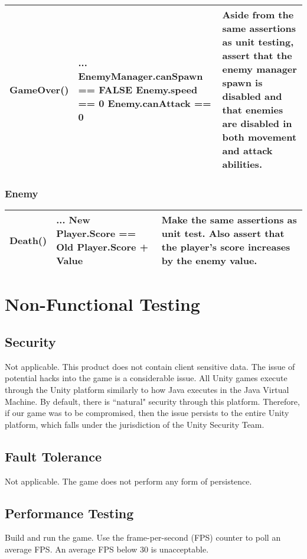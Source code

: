 \begin{table}[H]
	\renewcommand*{\arraystretch}{1.5}
	\centering
	\begin{tabular}{ | c | C{7cm} | L{4cm} |}
		\hline
		GameOver()
			&	... \newline
				EnemyManager.canSpawn == FALSE \newline
				Enemy.speed == 0 \newline
				Enemy.canAttack == 0 
			&	Aside from the same assertions as unit testing, assert that the enemy manager spawn is disabled and that enemies are disabled in both movement and attack abilities.\\
		\hline
	\end{tabular}
\end{table}

\subsubsection{Enemy}

\begin{table}[H]
	\renewcommand*{\arraystretch}{1.5}
	\centering
	\begin{tabular}{ | c | C{7cm} | L{4cm} |}
		\hline
		Death()
			&	... \newline
				New Player.Score == Old Player.Score + Value
			&	Make the same assertions as unit test. Also assert that the player's score increases by the enemy value.\\
		\hline
	\end{tabular}
\end{table}


\section{Non-Functional Testing}

\subsection{Security}

Not applicable. This product does not contain client sensitive data. The issue of potential hacks into the game is a considerable issue. All Unity games execute through the Unity platform similarly to how Java executes in the Java Virtual Machine. By default, there is ``natural" security through this platform. Therefore, if our game was to be compromised, then the issue persists to the entire Unity platform, which falls under the jurisdiction of the Unity Security Team.

\subsection{Fault Tolerance}

Not applicable. The game does not perform any form of persistence.

\subsection{Performance Testing}

Build and run the game. Use the frame-per-second (FPS) counter to poll an average FPS. An average FPS below 30 is unacceptable. 

